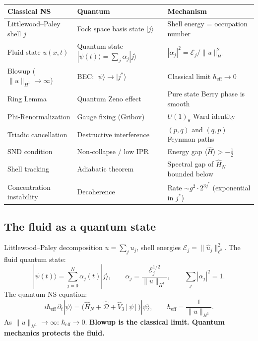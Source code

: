 \documentclass[12pt]{article}
\newcommand{\ket}[1]{|{#1}\rangle}
\newcommand{\half}{\tfrac{1}{2}}
\begin{document}
\begin{center}
\renewcommand{\arraystretch}{1.55}
\small
\begin{tabular}{@{}p{4.2cm}p{4.2cm}p{4.2cm}@{}}
\toprule
\textbf{Classical NS} & \textbf{Quantum} & \textbf{Mechanism} \\
\midrule
Littlewood--Paley shell $j$ &
  Fock space basis state $\ket{j}$ &
  Shell energy = occupation number \\
Fluid state $u(x,t)$ &
  Quantum state $\ket{\psi(t)} = \sum_j\alpha_j\ket{j}$ &
  $|\alpha_j|^2 = \mathcal{E}_j/\|u\|_{H^1}^2$ \\
Blowup ($\|u\|_{H^1}\to\infty$) &
  BEC: $\ket{\psi}\to\ket{j^*}$ &
  Classical limit $\hbar_{\mathrm{eff}}\to0$ \\
Ring Lemma &
  Quantum Zeno effect &
  Pure state Berry phase is smooth \\
Phi-Renormalization &
  Gauge fixing (Gribov) &
  $U(1)_\theta$ Ward identity \\
Triadic cancellation &
  Destructive interference &
  $(p,q)$ and $(q,p)$ Feynman paths \\
SND condition &
  Non-collapse / low IPR &
  Energy gap $\langle\hat{H}\rangle > -\half$ \\
Shell tracking &
  Adiabatic theorem &
  Spectral gap of $\hat{H}_N$ bounded below \\
Concentration instability &
  Decoherence &
  Rate $\sim g^2\cdot2^{3j^*}$ (exponential in $j^*$) \\
\bottomrule
\end{tabular}
\end{center}

\subsection{The fluid as a quantum state}
\label{sec:ns-fluid}

Littlewood--Paley decomposition $u = \sum_j u_j$, shell energies
$\mathcal{E}_j = \|\hat{u}_j\|_{\ell^2}^2$.
The fluid quantum state:
\[
  \ket{\psi(t)} = \sum_{j=0}^N \alpha_j(t)\ket{j},
  \qquad \alpha_j = \frac{\mathcal{E}_j^{1/2}}{\|u\|_{H^1}},
  \qquad \sum_j|\alpha_j|^2 = 1.
\]
The quantum NS equation:
\[
  i\hbar_{\mathrm{eff}}\,\partial_t\ket{\psi}
  = \bigl(\hat{H}_N + \hat{\mathcal{D}} + \hat{V}_3[\psi]\bigr)\ket{\psi},
  \qquad \hbar_{\mathrm{eff}} = \frac{1}{\|u\|_{H^1}}.
\]
As $\|u\|_{H^1}\to\infty$: $\hbar_{\mathrm{eff}}\to0$.
\textbf{Blowup is the classical limit. Quantum mechanics protects the fluid.}
\end{document}
